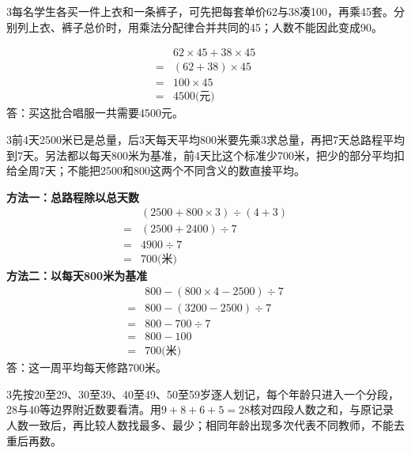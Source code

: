 \documentclass[multi=snippet,border={5bp 20bp 5bp 5bp}]{standalone}
\newenvironment{snippet}[3]{\begin{minipage}{#1bp}\color{answerred}\fontsize{#2}{#3}\selectfont\raggedright}{\end{minipage}}
\begin{document}
\begin{snippet}{505}{11.5}{14}\begin{multicols}{3}\raggedcolumns 每名学生各买一件上衣和一条裤子，可先把每套单价62与38凑100，再乘45套。分别列上衣、裤子总价时，用乘法分配律合并共同的45；人数不能因此变成90。\par \[\begin{aligned}&62\times45+38\times45\\={}&(62+38)\times45\\={}&100\times45\\={}&4500\text{(元)}\end{aligned}\]答：买这批合唱服一共需要4500元。\end{multicols}\end{snippet}
\begin{snippet}{505}{11.5}{14}\begin{multicols}{3}\raggedcolumns 前4天2500米已是总量，后3天每天平均800米要先乘3求总量，再把7天总路程平均到7天。另法都以每天800米为基准，前4天比这个标准少700米，把少的部分平均扣给全周7天；不能把2500和800这两个不同含义的数直接平均。\par \textbf{方法一：总路程除以总天数}\[\begin{aligned} &(2500+800\times3)\div(4+3)\\={}&(2500+2400)\div7\\={}&4900\div7\\={}&700\text{(米)}\end{aligned}\]\textbf{方法二：以每天800米为基准}\[\begin{aligned} &800-(800\times4-2500)\div7\\={}&800-(3200-2500)\div7\\={}&800-700\div7\\={}&800-100\\={}&700\text{(米)}\end{aligned}\]答：这一周平均每天修路700米。\end{multicols}\end{snippet}
\begin{snippet}{505}{11.5}{14}\begin{multicols}{3}\raggedcolumns 先按20至29、30至39、40至49、50至59岁逐人划记，每个年龄只进入一个分段，28与40等边界附近数要看清。用\(9+8+6+5=28\)\allowbreak 核对四段人数之和，与原记录人数一致后，再比较人数找最多、最少；相同年龄出现多次代表不同教师，不能去重后再数。\end{multicols}\end{snippet}
\end{document}
